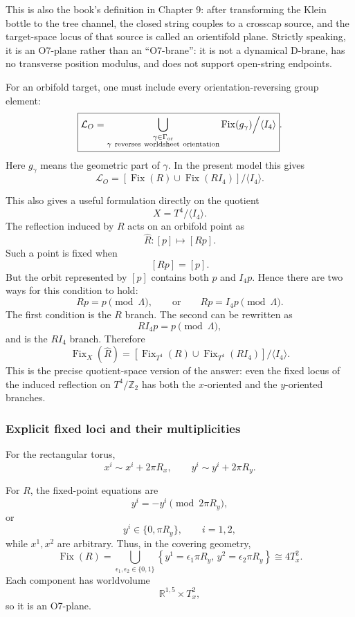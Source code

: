 \documentclass[
  10pt,
  a4paper,
  openany]{book}
\begin{document}
This is also the book's definition in Chapter 9: after transforming the
Klein bottle to the tree channel, the closed string couples to a
crosscap source, and the target-space locus of that source is called an
orientifold plane. Strictly speaking, it is an O7-plane rather than an
``O7-brane'': it is not a dynamical D-brane, has no transverse position
modulus, and does not support open-string endpoints.

For an orbifold target, one must include every orientation-reversing
group element: \[
\boxed{
\mathcal L_O
=
\bigcup_{\substack{\gamma\in\Gamma_{\mathrm{or}}\\
\gamma\ {\rm reverses\ worldsheet\ orientation}}}
\operatorname{Fix}(g_\gamma)
\Big/
\langle I_4\rangle
}.
\] Here \(g_\gamma\) means the geometric part of \(\gamma\). In the
present model this gives \[
\mathcal L_O
=
\left[
\operatorname{Fix}(R)
\cup
\operatorname{Fix}(RI_4)
\right]
\Big/
\langle I_4\rangle.
\]

This also gives a useful formulation directly on the quotient \[
X=T^4/\langle I_4\rangle.
\] The reflection induced by \(R\) acts on an orbifold point as \[
\widehat R:[p]\mapsto[Rp].
\] Such a point is fixed when \[
[Rp]=[p].
\] But the orbit represented by \([p]\) contains both \(p\) and
\(I_4p\). Hence there are two ways for this condition to hold: \[
Rp=p
\pmod{\Lambda},
\qquad\text{or}\qquad
Rp=I_4p
\pmod{\Lambda}.
\] The first condition is the \(R\) branch. The second can be rewritten
as \[
RI_4p=p
\pmod{\Lambda},
\] and is the \(RI_4\) branch. Therefore \[
\boxed{
\operatorname{Fix}_X(\widehat R)
=
\left[
\operatorname{Fix}_{T^4}(R)
\cup
\operatorname{Fix}_{T^4}(RI_4)
\right]
\Big/
\langle I_4\rangle
}.
\] This is the precise quotient-space version of the answer: even the
fixed locus of the induced reflection on \(T^4/\mathbb Z_2\) has both
the \(x\)-oriented and the \(y\)-oriented branches.

\subsubsection{Explicit fixed loci and their
multiplicities}\label{explicit-fixed-loci-and-their-multiplicities}

For the rectangular torus, \[
x^i\sim x^i+2\pi R_x,
\qquad
y^i\sim y^i+2\pi R_y.
\]

For \(R\), the fixed-point equations are \[
y^i=-y^i
\pmod{2\pi R_y},
\] or \[
y^i\in\{0,\pi R_y\},
\qquad i=1,2,
\] while \(x^1,x^2\) are arbitrary. Thus, in the covering geometry, \[
\boxed{
\operatorname{Fix}(R)
=
\bigcup_{\epsilon_1,\epsilon_2\in\{0,1\}}
\left\{
y^1=\epsilon_1\pi R_y,\,
y^2=\epsilon_2\pi R_y
\right\}
\cong
4T_x^2
}.
\] Each component has worldvolume \[
\mathbb R^{1,5}\times T_x^2,
\] so it is an O7-plane.
\end{document}
